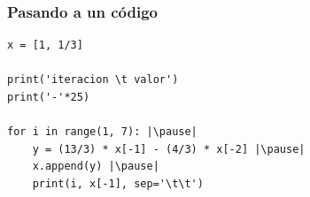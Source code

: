 \documentclass[12pt]{beamer}
\begin{document}
\begin{frame}[fragile]
\frametitle{Pasando a un código}
\begin{lstlisting}[caption=Implementando el código de la sucesión]
x = [1, 1/3]

print('iteracion \t valor')
print('-'*25)

for i in range(1, 7): |\pause|
	y = (13/3) * x[-1] - (4/3) * x[-2] |\pause|
	x.append(y) |\pause|
	print(i, x[-1], sep='\t\t') 
\end{lstlisting}
\end{frame}
\end{document}
